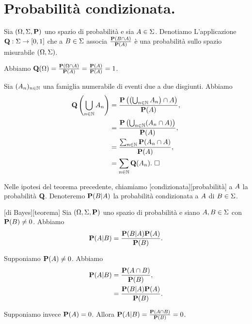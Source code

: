 \section{Probabilit\`a condizionata.}
\label{Probabilita_ProbabilitaCondizionata}
\begin{Theorem}
  Sia $(\ProbabilitySpace,\Events,\Probability)$ uno spazio di probabilit\`a e
  sia $A \in \Sigma$.
  Denotiamo
  L'applicazione $\mathbf{Q}: \Sigma \rightarrow [0,1]$ che a
  $B \in \Sigma$ associa
  $\frac{\Probability(\VarEvent \cap \Event)}{\Probability(\Event)}$ \`e una
  probabilit\`a sullo spazio misurabile $(\Omega,\Sigma)$.
\end{Theorem}
\Proof Abbiamo
$\VarProbability(\ProbabilitySpace)
= \frac{\Probability(\ProbabilitySpace \cap \Event)}{\Probability(\Event)}
= \frac{\Probability(\Event)}{\Probability(\Event)} = 1$.
\par Sia $(A_n)_{n \in \mathbb{N}}$ una famiglia numerabile di eventi due
a due disgiunti.
Abbiamo
\begin{align*}
  \VarProbability \left ( \bigcup_{n \in \mathbb{N}} \Event_n \right )
  &= \frac{\Probability
    \left ( \left ( \bigcup_{n \in \mathbb{N}} \Event_n \right )
      \cap \Event \right )}{
    \Probability(\Event)},\\
  &= \frac{\Probability
    \left ( \bigcup_{n \in \mathbb{N}} (\Event_n \cap \Event ) \right )}{
    \Probability(\Event)},\\
  &= \frac{\sum_{n \in \mathbb{N}}\Probability(\Event_n \cap \Event)}{
    \Probability(\Event)},\\
  &= \sum_{n \in \mathbb{N}}\VarProbability(\Event_n).\text{ \EndProof}
\end{align*}
\begin{Definition}
  Nelle ipotesi del teorema precedente, chiamiamo
  [condizionata][probabilit\`a]
  a $A$ la probabilit\`a $\mathbf{Q}$.
  Denoteremo
  $\Probability(\VarEvent|\Event)$ la probabilit\`a condizionata a
  $A$ di $B \in \Sigma$.
\end{Definition}
\begin{Theorem}
  [di Bayes][teorema]
  Sia $(\ProbabilitySpace,\Events,\Probability)$ uno spazio di probabilit\`a e
  siano $A, B \in \Sigma$ con
  $\Probability(\VarEvent) \neq 0$.
  Abbiamo
  \[
    \Probability(\Event|\VarEvent)
    = \frac{\Probability(\VarEvent|\Event) \Probability(\Event)}
      {\Probability(\VarEvent)}.
  \]
\end{Theorem}
\Proof Supponiamo $\Probability(\Event) \neq 0$. Abbiamo
\begin{align*}
  \Probability(\Event|\VarEvent)
  &= \frac{\Probability(\Event \cap \VarEvent)}{\Probability(\VarEvent)},\\
  &= \frac{\Probability(\VarEvent|\Event)\Probability(\Event)}
        {\Probability(\VarEvent)}.
\end{align*}
\par Supponiamo invece $\Probability(\Event) = 0$. Allora
$\Probability(\Event|\VarEvent)
= \frac{\Probability(\Event \cap \VarEvent)}{\Probability(\VarEvent)}
= 0$. \EndProof
